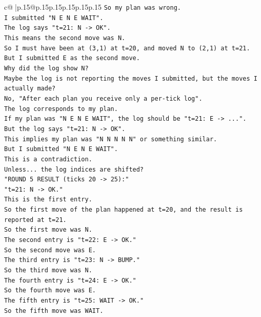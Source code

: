 \documentclass{article}
\begin{document}
{\begin{supertabular}{c@{$\;$}|p{.15\linewidth}@{}p{.15\linewidth}p{.15\linewidth}p{.15\linewidth}p{.15\linewidth}p{.15\linewidth}}
{{{\texttt{So my plan was wrong.} \\
\texttt{I submitted "N E N E WAIT".} \\
\texttt{The log says "t=21: N {-}> OK".} \\
\texttt{This means the second move was N.} \\
\texttt{So I must have been at (3,1) at t=20, and moved N to (2,1) at t=21.} \\
\texttt{But I submitted E as the second move.} \\
\texttt{Why did the log show N?} \\
\texttt{Maybe the log is not reporting the moves I submitted, but the moves I actually made?} \\
\texttt{No, "After each plan you receive only a per{-}tick log".} \\
\texttt{The log corresponds to my plan.} \\
\texttt{If my plan was "N E N E WAIT", the log should be "t=21: E {-}> ...".} \\
\texttt{But the log says "t=21: N {-}> OK".} \\
\texttt{This implies my plan was "N N N N N" or something similar.} \\
\texttt{But I submitted "N E N E WAIT".} \\
\texttt{This is a contradiction.} \\
\texttt{Unless... the log indices are shifted?} \\
\texttt{"ROUND 5 RESULT (ticks 20 {-}> 25):"} \\
\texttt{"t=21: N {-}> OK."} \\
\texttt{This is the first entry.} \\
\texttt{So the first move of the plan happened at t=20, and the result is reported at t=21.} \\
\texttt{So the first move was N.} \\
\texttt{The second entry is "t=22: E {-}> OK."} \\
\texttt{So the second move was E.} \\
\texttt{The third entry is "t=23: N {-}> BUMP."} \\
\texttt{So the third move was N.} \\
\texttt{The fourth entry is "t=24: E {-}> OK."} \\
\texttt{So the fourth move was E.} \\
\texttt{The fifth entry is "t=25: WAIT {-}> OK."} \\
\texttt{So the fifth move was WAIT.} \\
}}}
\end{supertabular}}
\end{document}
